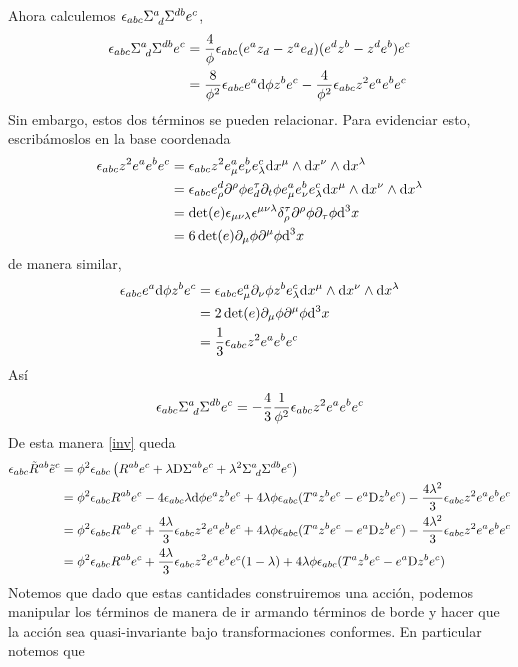 Ahora calculemos $\epsilon_{abc}\Sigma^{a}_{~d}\Sigma^{db}e^c$,
\begin{align}
  \epsilon_{abc}\Sigma^{a}_{~d}\Sigma^{db}e^c&=\frac{4}{\phi}\epsilon_{abc}(e^{a}z_d-z^{a}e_d)(e^dz^b-z^de^b)e^c\\
  &=\frac{8}{\phi^2}\epsilon_{abc} e^{a}\dd\phi z^be^c-\frac{4}{\phi^2}\epsilon_{abc} z^2e^{a}e^be^c
\end{align}
Sin embargo, estos dos términos se pueden relacionar. Para evidenciar esto, escribámoslos en la base coordenada
\begin{align}
  \epsilon_{abc} z^2e^{a}e^be^c&=\epsilon_{abc} z^2e^{a}_\mu e^b_\nu e^c_\lambda \dd x^\mu\wedge\dd x^\nu\wedge\dd x^\lambda\\
  &=\epsilon_{abc} e^{d}_\rho \partial^\rho\phi e^\tau_d\partial_t\phi e^{a}_\mu e^b_\nu e^c_\lambda \dd x^\mu\wedge\dd x^\nu\wedge\dd x^\lambda\\
  &=\det(e)\epsilon_{\mu\nu\lambda}\epsilon^{\mu\nu\lambda}\delta ^\tau_\rho \partial^\rho\phi\partial_\tau\phi\dd^3x\\
  &=6\det(e)\partial_\mu\phi\partial^\mu\phi\dd^3x\label{z2eee}
\end{align}
de manera similar,
\begin{align}
  \epsilon_{abc} e^{a}\dd\phi z^be^c&=\epsilon_{abc} e^{a}_\mu\partial_\nu \phi z^be^c_\lambda \dd x^\mu \wedge\dd x^\nu\wedge\dd x^\lambda\\
  &=2\det(e)\partial_\mu\phi\partial^\mu\phi\dd^3x\\
  &=\frac{1}{3}\epsilon_{abc} z^2e^{a}e^be^c
\end{align}
Así
\begin{equation}
  \epsilon_{abc}\Sigma^{a}_{~d}\Sigma^{db}e^c=-\frac{4}{3}\frac{1}{\phi^2}\epsilon_{abc} z^2e^{a}e^be^c
\end{equation}
De esta manera \eqref{inv} queda
\begin{align*}
    \epsilon_{abc}\tilde{R}^{ab} \tilde{e}^c&=\phi^2\epsilon_{abc}\left(R^{ab} e^c+\lambda \mathrm{D} \Sigma^{ab} e^c+\lambda^2 \Sigma^{a}_{~d} \Sigma^{db} e^c\right)\\
    &=\phi^2\epsilon_{abc} R^{ab}e^c-4\epsilon_{abc}\lambda\dd\phi e^{a}z^be^c+4\lambda \phi\epsilon_{abc}(T^{a}z^be^c-e^{a}\mathrm{D} z^be^c)-\frac{4\lambda^2}{3}\epsilon_{abc} z^2e^{a}e^be^c\\
    &=\phi^2\epsilon_{abc} R^{ab}e^c+\frac{4\lambda}{3}\epsilon_{abc} z^2e^{a}e^be^c+4\lambda \phi\epsilon_{abc}(T^{a}z^be^c-e^{a}\mathrm{D} z^be^c)-\frac{4\lambda^2}{3}\epsilon_{abc} z^2e^{a}e^be^c\\
    &=\phi^2\epsilon_{abc} R^{ab}e^c+\frac{4\lambda}{3}\epsilon_{abc} z^2e^{a}e^be^c(1-\lambda)+4\lambda \phi\epsilon_{abc}(T^{a}z^be^c-e^{a}\mathrm{D} z^be^c)
\end{align*}
Notemos que dado que estas cantidades construiremos una acción, podemos manipular los términos de manera de ir armando términos de borde y hacer que la acción sea quasi-invariante bajo transformaciones conformes. En particular notemos que
